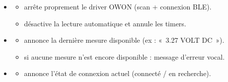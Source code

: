 \documentclass[letterpaper,10pt,french]{sphinxmanual}
\begin{document}
\begin{fulllineitems}
\begin{itemize}
\begin{description}
\begin{itemize}
\item {} 
\sphinxAtStartPar
remet à zéro le mode de lecture automatique (on revient en manuel).

\item {} 
\sphinxAtStartPar
l’annonce « Mode X : Multimètre » est gérée par le .

\end{itemize}

\end{description}

\item {} \begin{description}
\begin{itemize}
\item {} 
\sphinxAtStartPar
arrête proprement le driver OWON (scan + connexion BLE).

\item {} 
\sphinxAtStartPar
désactive la lecture automatique et annule les timers.

\end{itemize}

\end{description}

\item {} \begin{description}
\begin{itemize}
\item {} 
\sphinxAtStartPar
annonce la dernière mesure disponible (ex : « 3.27 VOLT DC »).

\item {} 
\sphinxAtStartPar
si aucune mesure n’est encore disponible : message d’erreur vocal.

\end{itemize}

\end{description}

\item {} \begin{description}
\begin{itemize}
\item {} 
\sphinxAtStartPar
annonce l’état de connexion actuel (connecté / en recherche).

\end{itemize}

\end{description}


\end{itemize}
\end{fulllineitems}
\end{document}
